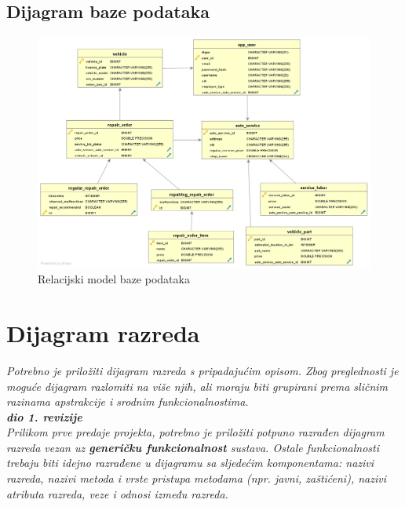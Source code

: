 			
			\subsection{Dijagram baze podataka}
				
				\begin{figure}[h]
					\centering
					\includegraphics[width=1.0\linewidth]{dijagrami/er-diagram}
					\caption{Relacijski model baze podataka}
					\label{fig:er-diagram}
				\end{figure}
			
			\eject
			
			
		\section{Dijagram razreda}
		
			\textit{Potrebno je priložiti dijagram razreda s pripadajućim opisom. Zbog preglednosti je moguće dijagram razlomiti na više njih, ali moraju biti grupirani prema sličnim razinama apstrakcije i srodnim funkcionalnostima.}\\
			
			\textbf{\textit{dio 1. revizije}}\\
			
			\textit{Prilikom prve predaje projekta, potrebno je priložiti potpuno razrađen dijagram razreda vezan uz \textbf{generičku funkcionalnost} sustava. Ostale funkcionalnosti trebaju biti idejno razrađene u dijagramu sa sljedećim komponentama: nazivi razreda, nazivi metoda i vrste pristupa metodama (npr. javni, zaštićeni), nazivi atributa razreda, veze i odnosi između razreda.}\\
			
